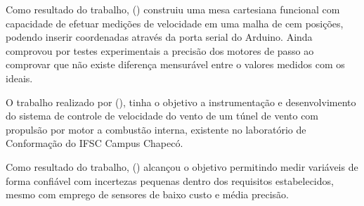 Como resultado do trabalho, \citeauthor{ramos2018desenvolvimento} (\citeyear{ramos2018desenvolvimento}) construiu 
uma mesa cartesiana funcional com capacidade de efetuar medições de velocidade em uma malha de cem posições, 
podendo inserir coordenadas através da porta serial do Arduino. Ainda comprovou por testes experimentais a 
precisão dos motores de passo ao comprovar que não existe diferença mensurável entre o valores medidos com os ideais.

O trabalho realizado por \citeauthor{hoss2018implantaccao} (\citeyear{hoss2018implantaccao}), tinha o objetivo 
a instrumentação e desenvolvimento do sistema de controle de velocidade do vento de um túnel de vento com 
propulsão por motor a combustão interna, existente no laboratório de Conformação do IFSC Campus Chapecó.

Como resultado do trabalho, \citeauthor{hoss2018implantaccao} (\citeyear{hoss2018implantaccao}) alcançou o objetivo 
permitindo medir variáveis de forma confiável com incertezas pequenas dentro dos requisitos estabelecidos, mesmo 
com emprego de sensores de baixo custo e média precisão.
